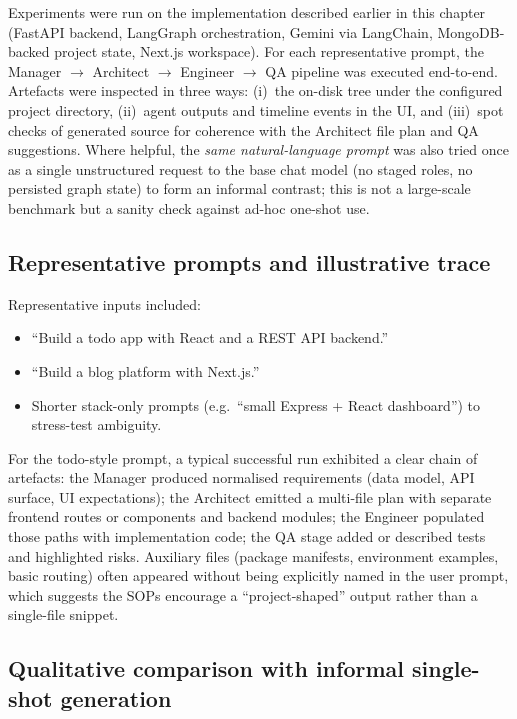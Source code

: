 Experiments were run on the implementation described earlier in this chapter (FastAPI backend, LangGraph orchestration, Gemini via LangChain, MongoDB-backed project state, Next.js workspace). For each representative prompt, the Manager $\rightarrow$ Architect $\rightarrow$ Engineer $\rightarrow$ QA pipeline was executed end-to-end. Artefacts were inspected in three ways: (i)~the on-disk tree under the configured project directory, (ii)~agent outputs and timeline events in the UI, and (iii)~spot checks of generated source for coherence with the Architect file plan and QA suggestions. Where helpful, the \emph{same natural-language prompt} was also tried once as a single unstructured request to the base chat model (no staged roles, no persisted graph state) to form an informal contrast; this is not a large-scale benchmark but a sanity check against ad-hoc one-shot use.

\subsection{Representative prompts and illustrative trace}

Representative inputs included:
\begin{itemize}
    \item ``Build a todo app with React and a REST API backend.''
    \item ``Build a blog platform with Next.js.''
    \item Shorter stack-only prompts (e.g.\ ``small Express + React dashboard'') to stress-test ambiguity.
\end{itemize}

For the todo-style prompt, a typical successful run exhibited a clear chain of artefacts: the Manager produced normalised requirements (data model, API surface, UI expectations); the Architect emitted a multi-file plan with separate frontend routes or components and backend modules; the Engineer populated those paths with implementation code; the QA stage added or described tests and highlighted risks. Auxiliary files (package manifests, environment examples, basic routing) often appeared without being explicitly named in the user prompt, which suggests the SOPs encourage a ``project-shaped'' output rather than a single-file snippet.

\subsection{Qualitative comparison with informal single-shot generation}

